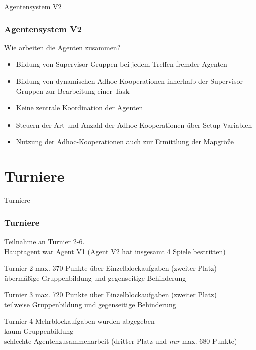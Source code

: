 \documentclass[aspectratio=169]{beamer} %
\begin{document}
\begin{frame}{Agentensystem V2}
	\frametitle{Agentensystem V2}
	\begin{block}{Wie arbeiten die Agenten zusammen?}
	\end{block}
	\textbf{ }
	\begin{itemize}
		\setlength\itemsep{5mm}
		\item Bildung von Supervisor-Gruppen bei jedem Treffen fremder Agenten		
		\item Bildung von dynamischen Adhoc-Kooperationen innerhalb der Supervisor-Gruppen zur Bearbeitung einer Task
		\item Keine zentrale Koordination der Agenten
		\item Steuern der Art und Anzahl der Adhoc-Kooperationen über Setup-Variablen
		\item Nutzung der Adhoc-Kooperationen auch zur Ermittlung der Mapgröße
	\end{itemize}
\end{frame}

\section{Turniere}

\begin{frame}{Turniere}
\frametitle{Turniere}
Teilnahme an Turnier 2-6. \\ Hauptagent war Agent V1 (Agent V2 hat insgesamt 4 Spiele bestritten)
\begin{block}{Turnier 2}
\textcolor{teal}{\smiley{}} max. 370 Punkte über Einzelblockaufgaben (zweiter Platz) \\
\textcolor{red}{\frownie{}} übermäßige Gruppenbildung und gegenseitige Behinderung  
\end{block}
\begin{block}{Turnier 3}
\textcolor{teal}{\smiley{}} max. 720 Punkte über Einzelblockaufgaben (zweiter Platz) \\
\textcolor{red}{\frownie{}} teilweise Gruppenbildung und gegenseitige Behinderung  
\end{block}
\begin{block}{Turnier 4}
\textcolor{teal}{\smiley{}} Mehrblockaufgaben wurden abgegeben \\
\textcolor{teal}{\smiley{}} kaum Gruppenbildung \\
\textcolor{red}{\frownie{}} schlechte Agentenzusammenarbeit (dritter Platz und \textit{nur} max. 680 Punkte)
\end{block}
\end{frame}
\end{document}
